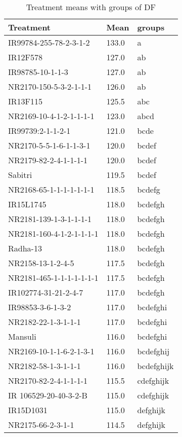 \documentclass[]{article}
\begin{document}
\begin{longtable}{lll}
\caption{\label{tab:two-fac-groups-tab1}Treatment means with groups of DF}\\
\toprule
Treatment & Mean & groups\\
\midrule
\rowcolor{gray!6}  IR99784-255-78-2-3-1-2 & 133.0 & a\\
IR12F578 & 127.0 & ab\\
\rowcolor{gray!6}  IR98785-10-1-1-3 & 127.0 & ab\\
NR2170-150-5-3-2-1-1-1 & 126.0 & ab\\
\rowcolor{gray!6}  IR13F115 & 125.5 & abc\\
\addlinespace
NR2169-10-4-1-2-1-1-1-1 & 123.0 & abcd\\
\rowcolor{gray!6}  IR99739:2-1-1-2-1 & 121.0 & bcde\\
NR2170-5-5-1-6-1-1-3-1 & 120.0 & bcdef\\
\rowcolor{gray!6}  NR2179-82-2-4-1-1-1-1 & 120.0 & bcdef\\
Sabitri & 119.5 & bcdef\\
\addlinespace
\rowcolor{gray!6}  NR2168-65-1-1-1-1-1-1-1 & 118.5 & bcdefg\\
IR15L1745 & 118.0 & bcdefgh\\
\rowcolor{gray!6}  NR2181-139-1-3-1-1-1-1 & 118.0 & bcdefgh\\
NR2181-160-4-1-2-1-1-1-1 & 118.0 & bcdefgh\\
\rowcolor{gray!6}  Radha-13 & 118.0 & bcdefgh\\
\addlinespace
NR2158-13-1-2-4-5 & 117.5 & bcdefgh\\
\rowcolor{gray!6}  NR2181-465-1-1-1-1-1-1-1 & 117.5 & bcdefgh\\
IR102774-31-21-2-4-7 & 117.0 & bcdefgh\\
\rowcolor{gray!6}  IR98853-3-6-1-3-2 & 117.0 & bcdefghi\\
NR2182-22-1-3-1-1-1 & 117.0 & bcdefghi\\
\addlinespace
\rowcolor{gray!6}  Mansuli & 116.0 & bcdefghi\\
NR2169-10-1-1-6-2-1-3-1 & 116.0 & bcdefghij\\
\rowcolor{gray!6}  NR2182-58-1-3-1-1-1 & 116.0 & bcdefghijk\\
NR2170-82-2-4-1-1-1-1 & 115.5 & cdefghijk\\
\rowcolor{gray!6}  IR 106529-20-40-3-2-B & 115.0 & cdefghijk\\
\addlinespace
IR15D1031 & 115.0 & defghijk\\
\rowcolor{gray!6}  NR2175-66-2-3-1-1 & 114.5 & defghijk\\

\end{longtable}
\end{document}

